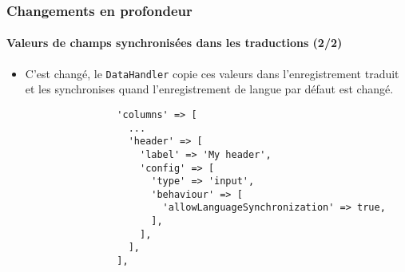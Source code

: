 
\begin{frame}[fragile]
	\frametitle{Changements en profondeur}
	\framesubtitle{Valeurs de champs synchronisées dans les traductions (2/2)}

	\lstset{basicstyle=\tiny\ttfamily}

	\begin{itemize}
		\item C'est changé, le \texttt{DataHandler} copie ces valeurs dans l'enregistrement
			traduit et les synchronises quand l'enregistrement de langue par défaut est
			changé.

			\begin{lstlisting}
				'columns' => [
				  ...
				  'header' => [
				    'label' => 'My header',
				    'config' => [
				      'type' => 'input',
				      'behaviour' => [
				        'allowLanguageSynchronization' => true,
				      ],
				    ],
				  ],
				],
			\end{lstlisting}

	\end{itemize}

\end{frame}


